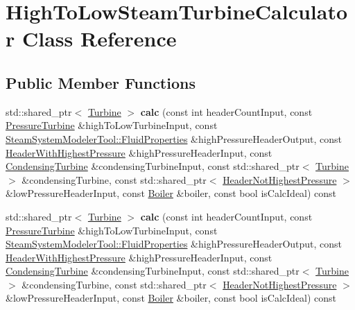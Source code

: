 \hypertarget{class_high_to_low_steam_turbine_calculator}{}\section{High\+To\+Low\+Steam\+Turbine\+Calculator Class Reference}
\label{class_high_to_low_steam_turbine_calculator}
\subsection*{Public Member Functions}
\begin{DoxyCompactItemize}
\item 
\mbox{\label{class_high_to_low_steam_turbine_calculator_ab4cc99913cf69e4b820d1d27f9c60e67}} 
std\+::shared\+\_\+ptr$<$ \hyperlink{class_turbine}{Turbine} $>$ {\bfseries calc} (const int header\+Count\+Input, const \hyperlink{class_pressure_turbine}{Pressure\+Turbine} \&high\+To\+Low\+Turbine\+Input, const \hyperlink{struct_steam_system_modeler_tool_1_1_fluid_properties}{Steam\+System\+Modeler\+Tool\+::\+Fluid\+Properties} \&high\+Pressure\+Header\+Output, const \hyperlink{class_header_with_highest_pressure}{Header\+With\+Highest\+Pressure} \&high\+Pressure\+Header\+Input, const \hyperlink{class_condensing_turbine}{Condensing\+Turbine} \&condensing\+Turbine\+Input, const std\+::shared\+\_\+ptr$<$ \hyperlink{class_turbine}{Turbine} $>$ \&condensing\+Turbine, const std\+::shared\+\_\+ptr$<$ \hyperlink{class_header_not_highest_pressure}{Header\+Not\+Highest\+Pressure} $>$ \&low\+Pressure\+Header\+Input, const \hyperlink{class_boiler}{Boiler} \&boiler, const bool is\+Calc\+Ideal) const
\item 
\mbox{\label{class_high_to_low_steam_turbine_calculator_aaa08152db817144f5bfba90a858882bf}} 
std\+::shared\+\_\+ptr$<$ \hyperlink{class_turbine}{Turbine} $>$ {\bfseries calc} (const int header\+Count\+Input, const \hyperlink{class_pressure_turbine}{Pressure\+Turbine} \&high\+To\+Low\+Turbine\+Input, const \hyperlink{struct_steam_system_modeler_tool_1_1_fluid_properties}{Steam\+System\+Modeler\+Tool\+::\+Fluid\+Properties} \&high\+Pressure\+Header\+Output, const \hyperlink{class_header_with_highest_pressure}{Header\+With\+Highest\+Pressure} \&high\+Pressure\+Header\+Input, const \hyperlink{class_condensing_turbine}{Condensing\+Turbine} \&condensing\+Turbine\+Input, const std\+::shared\+\_\+ptr$<$ \hyperlink{class_turbine}{Turbine} $>$ \&condensing\+Turbine, const std\+::shared\+\_\+ptr$<$ \hyperlink{class_header_not_highest_pressure}{Header\+Not\+Highest\+Pressure} $>$ \&low\+Pressure\+Header\+Input, const \hyperlink{class_boiler}{Boiler} \&boiler, const bool is\+Calc\+Ideal) const

\end{DoxyCompactItemize}

